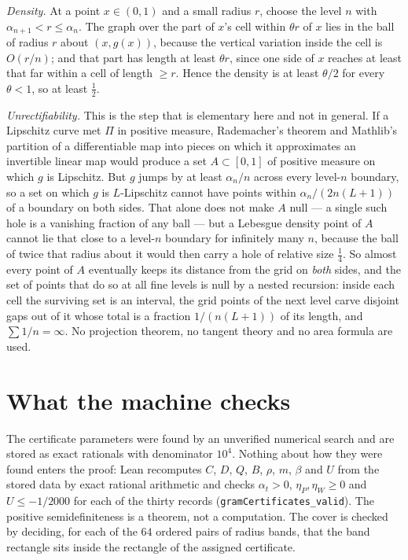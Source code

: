 \documentclass[11pt]{article}
\begin{document}
\emph{Density.} At a point $x\in(0,1)$ and a small radius $r$, choose the level $n$ with
$\alpha_{n+1}<r\le\alpha_n$. The graph over the part of $x$'s cell within $\theta r$ of $x$ lies
in the ball of radius $r$ about $(x,g(x))$, because the vertical variation inside the cell is
$O(r/n)$; and that part has length at least $\theta r$, since one side of $x$ reaches at least
that far within a cell of length $\ge r$. Hence the density is at least $\theta/2$ for every
$\theta<1$, so at least $\tfrac12$.

\emph{Unrectifiability.} This is the step that is elementary here and not in general. If a
Lipschitz curve met $\Pi$ in positive measure, Rademacher's theorem and Mathlib's partition of a
differentiable map into pieces on which it approximates an invertible linear map would produce
a set $A\subset[0,1]$ of positive measure on which $g$ is Lipschitz. But $g$ jumps by at least
$\alpha_n/n$ across every level-$n$ boundary, so a set on which $g$ is $L$-Lipschitz cannot have
points within $\alpha_n/(2n(L+1))$ of a boundary on both sides. That alone does not make $A$
null — a single such hole is a vanishing fraction of any ball — but a Lebesgue density point of
$A$ cannot lie that close to a level-$n$ boundary for infinitely many $n$, because the ball of
twice that radius about it would then carry a hole of relative size $\tfrac14$. So almost every
point of $A$ eventually keeps its distance from the grid on \emph{both} sides, and the set of
points that do so at all fine levels is null by a nested recursion: inside each cell the
surviving set is an interval, the grid points of the next level carve disjoint gaps out of it
whose total is a fraction $1/(n(L+1))$ of its length, and $\sum 1/n=\infty$. No projection
theorem, no tangent theory and no area formula are used.

\section{What the machine checks}

The certificate parameters were found by an unverified numerical search and are stored as exact
rationals with denominator $10^4$. Nothing about how they were found enters the proof: Lean
recomputes $C$, $D$, $Q$, $B$, $\rho$, $m$, $\beta$ and $U$ from the stored data by exact rational
arithmetic and checks $\alpha_t>0$, $\eta_P,\eta_W\ge0$ and $U\le-1/2000$ for each of the thirty
records (\texttt{gramCertificates\_valid}). The positive semidefiniteness is a theorem, not a
computation. The cover is checked by deciding, for each of the $64$ ordered pairs of radius bands,
that the band rectangle sits inside the rectangle of the assigned certificate.
\end{document}

